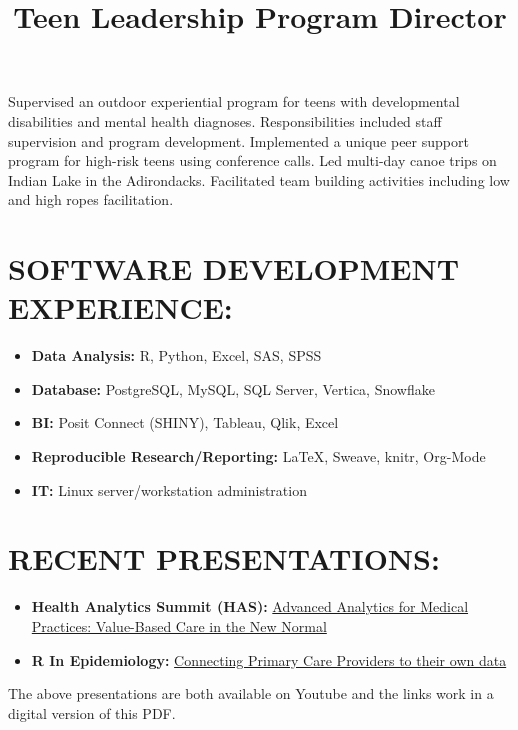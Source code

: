 \documentclass[line, mm, 10pt]{res}
\begin{document}
\begin{resume}
  \title{Teen Leadership Program Director}
  \begin{position}
    Supervised an outdoor experiential program for teens with
    developmental disabilities and mental health
    diagnoses. Responsibilities included staff supervision and program
    development. Implemented a unique peer support program for
    high-risk teens using conference calls. Led multi-day canoe trips
    on Indian Lake in the Adirondacks. Facilitated team building
    activities including low and high ropes facilitation.
  \end{position}

  \section{SOFTWARE DEVELOPMENT EXPERIENCE:}

  \begin{itemize}
    \item {\bf Data Analysis:} R, Python, Excel, SAS, SPSS
    \item {\bf Database:} PostgreSQL, MySQL, SQL Server, Vertica, Snowflake
    \item {\bf BI:} Posit Connect (SHINY), Tableau, Qlik, Excel 
    \item {\bf Reproducible Research/Reporting:} \LaTeX, Sweave, knitr, Org-Mode
    \item {\bf IT:} Linux server/workstation administration 
  \end{itemize}

  \section{RECENT PRESENTATIONS:}
  \begin{itemize}
    \item {\bf Health Analytics Summit (HAS):} {\href{https://www.youtube.com/watch?v=--vqwbJucPs}{Advanced Analytics for Medical Practices: Value-Based Care in the New Normal}}
    \item {\bf R In Epidemiology:} {\href{https://www.youtube.com/watch?v=-zhTXiiCj58}{Connecting Primary Care Providers to their own data}}
    \end{itemize}

    The above presentations are both available on Youtube and the
    links work in a digital version of this PDF.
  

\end{resume}
\end{document}
